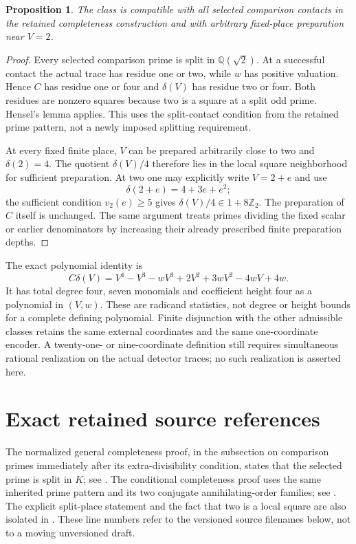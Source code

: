 \documentclass[11pt,a4paper]{article}
\newtheorem{proposition}{Proposition}
\newcommand{\Q}{\mathbb Q}
\begin{document}
\begin{proposition}
The class is compatible with all selected comparison contacts in the
retained completeness construction and with arbitrary fixed-place
preparation near $V=2$.
\end{proposition}
\begin{proof}
Every selected comparison prime is split in $\Q(\sqrt2)$. At a
successful contact the actual trace has residue one or two, while
$w$ has positive valuation. Hence $C$ has residue one or four and
$\delta(V)$ has residue two or four. Both residues are nonzero
squares because two is a square at a split odd prime. Hensel's lemma
applies. This uses the split-contact condition from the retained prime
pattern, not a newly imposed splitting requirement.

At every fixed finite place, $V$ can be prepared arbitrarily close to
two and $\delta(2)=4$. The quotient $\delta(V)/4$ therefore lies
in the local square neighborhood for sufficient preparation. At two
one may explicitly write $V=2+e$ and use
\[
 \delta(2+e)=4+3e+e^2;
\]
the sufficient condition $v_2(e)\ge5$ gives
$\delta(V)/4\in1+8\mathbb Z_2$. The preparation of $C$ itself
is unchanged. The same argument treats primes dividing the fixed
scalar or earlier denominators by increasing their already prescribed
finite preparation depths.
\end{proof}

The exact polynomial identity is
\[
 C\delta(V)=V^4-V^3-wV^3+2V^2+3wV^2-4wV+4w.
\]
It has total degree four, seven monomials and coefficient height four
as a polynomial in $(V,w)$. These are radicand statistics, not degree
or height bounds for a complete defining polynomial. Finite disjunction
with the other admissible classes retains the same external
coordinates and the same one-coordinate encoder. A twenty-one- or
nine-coordinate definition still requires simultaneous rational
realization on the actual detector traces; no such realization is
asserted here.

\section*{Exact retained source references}
The normalized general completeness proof, in the subsection on
comparison primes immediately after its extra-divisibility condition,
states that the selected prime is split in $K$; see
\cite[lines 811--835]{General}. The conditional completeness proof
uses the same inherited prime pattern and its two conjugate
annihilating-order families; see \cite[lines 559--595]{Conditional}.
The explicit split-place statement and the fact that two is a local
square are also isolated in \cite[Lemma ``Fresh split contacts'',
lines 382--404]{Native}. These line numbers refer to the versioned
source filenames below, not to a moving unversioned draft.
\end{document}
